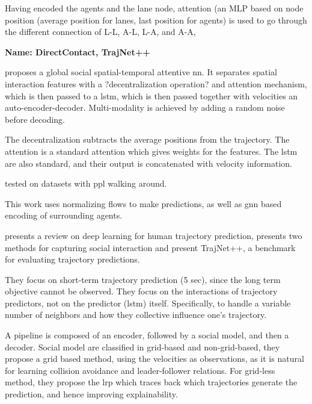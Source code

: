 Having encoded the agents and the lane node, attention (an MLP based on node position (average position for lanes, last position for agents) is used to go through the different connection of L-L, A-L, L-A, and A-A, 


\textbf{Name: DirectContact, TrajNet++}




\cite{xu2021tra2tra} proposes a global social spatial-temporal attentive \gls{nn}. 
%
It separates spatial interaction features with a ?decentralization operation? and attention mechanism, which is then passed to a \gls{lstm}, which is then passed together with velocities an auto-encoder-decoder.
%
Multi-modality is achieved by adding a random noise before decoding.

The decentralization subtracts the average positions from the trajectory.
%
The attention is a standard attention which gives weights for the features.
%
The \gls{lstm} are also standard, and their output is concatenated with velocity information.

tested on datasets with ppl walking around.

\cite{scholler2021flomo} This work uses normalizing flows to make predictions, as well as gnn based encoding of surrounding agents.


\cite{kothari2021human} presents a review on deep learning for human trajectory prediction, presents two methods for capturing social interaction and present TrajNet++, a benchmark for evaluating trajectory predictions. 

They focus on short-term trajectory prediction (5 sec), since the long term objective cannot be observed.
%
They focus on the interactions of trajectory predictors, not on the predictor (\gls{lstm}) itself.
%
Specifically, to handle a variable number of neighbors and how they collective influence one's trajectory.

A pipeline is composed of an encoder, followed by a social model, and then a decoder.
%
Social model are classified in grid-based and non-grid-based, they propose a grid based method, using the velocities as observations, as it is natural for learning collision avoidance and leader-follower relations.
%
For grid-less method, they propose the \gls{lrp} which traces back which trajectories generate the prediction, and hence improving explainability.

